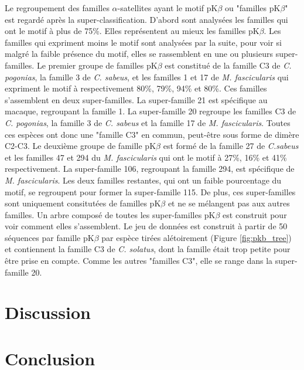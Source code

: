 \documentclass[12pt,a4paper]{article}
\begin{document}
	Le regroupement des familles $\alpha$-satellites ayant  le motif pK$\beta$ ou "familles pK$\beta$" est regardé après la super-classification. D'abord sont analysées les familles qui ont le motif à plus de 75\%. Elles représentent au mieux les familles pK$\beta$. Les familles qui expriment moins le motif sont analysées par la suite, pour voir si malgré la faible présence du motif, elles se rassemblent en une ou plusieurs super-familles.
	Le premier groupe de familles pK$\beta$ est constitué de la famille C3 de \textit{C. pogonias}, la famille 3 de \textit{C. sabeus}, et les familles 1 et 17 de \textit{M. fascicularis} qui expriment le motif à respectivement 80\%, 79\%, 94\% et 80\%. Ces familles s'assemblent en deux super-familles. La super-famille 21 est spécifique au macaque, regroupant la famille 1. La super-famille 20 regroupe les familles C3 de \textit{C. pogonias}, la famille 3 de \textit{C. sabeus} et la famille 17 de \textit{M. fascicularis}. Toutes ces espèces ont donc une "famille C3" en commun, peut-être sous forme de dimère C2-C3. Le deuxième groupe de famille pK$\beta$ est formé de la famille 27 de  \textit{C.sabeus} et les familles  47 et 294 du \textit{M. fascicularis} qui ont le motif à 27\%, 16\% et 41\% respectivement. La super-famille 106, regroupant la famille 294, est spécifique de \textit{M. fascicularis}. Les deux familles restantes, qui ont un faible pourcentage du motif, se regroupent pour former la super-famille 115. De plus, ces super-familles sont uniquement consitutées de familles pK$\beta$ et ne se mélangent pas aux autres familles.
	Un arbre composé de toutes les super-familles pK$\beta$ est construit pour voir comment elles s'assemblent. Le jeu de données est construit à partir de 50 séquences par famille pK$\beta$ par espèce tirées alétoirement (Figure \ref{fig:pkb_tree}) et contiennent la famille C3 de \textit{C. solatus}, dont la famille était trop petite pour être prise en compte. Comme les autres "familles C3", elle se range dans la super-famille 20. 

\section{Discussion}
\section{Conclusion}

\newpage
\strut  ~  \mbox{}  \null
\newpage

  
\end{document}
